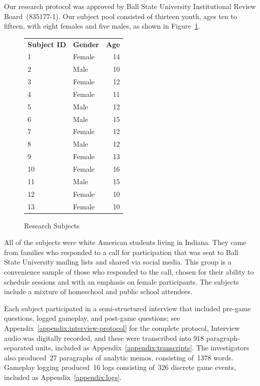\documentclass[letterpaper]{article}
\begin{document}
Our research protocol was approved by Ball State University
Institutional Review Board~(835177-1). 
Our subject pool consisted of thirteen youth, ages ten to fifteen,
with eight females and five males, as shown in Figure~\ref{fig:subjects}.
%
\begin{figure}
\begin{framed}
\centering
\begin{tabular}{llr}
\textbf{Subject ID} & \textbf{Gender} & \textbf{Age}\\
1 & Female & 14\\
2 & Male & 10\\
3 & Female & 12\\
4 & Female & 11\\
5 & Male & 12\\
6 & Male & 15\\
7 & Female & 12\\
8 & Male & 12\\
9 & Female & 13\\
10 & Female & 16\\
11 & Male & 15\\
12 & Female & 10\\
13 & Female & 10\\
\end{tabular}
\caption{Research Subjects}
\label{fig:subjects}
\end{framed}
\end{figure}
%
All of the subjects were
white American students living in Indiana. 
They came from families who responded to a call for participation that
was sent to Ball State University mailing lists and shared via social
media. This group is a convenience sample of those who responded to the
call, chosen for their ability to schedule sessions and with an emphasis
on female participants. The subjects include a mixture of homeschool
and public school attendees.

Each subject participated in a semi-structured interview that 
included pre-game questions, logged gameplay, and post-game questions;
see Appendix~\ref{appendix:interview-protocol} for the complete protocol,
Interview audio was digitally recorded, and these were transcribed
into 918 paragraph-separated units, 
included as Appendix~\ref{appendix:transcripts}.
The investigators also 
produced~27 paragraphs of analytic memos,
consisting of~1378 words.
Gameplay logging produced~16 logs consisting of~326 discrete game events,
included as Appendix~\ref{appendix:logs}.
\end{document}

